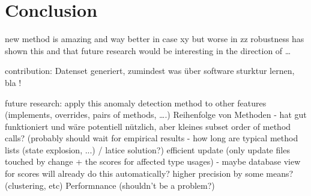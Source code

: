 \chapter{Conclusion}
	new method is amazing and way better in case xy but worse in zz
    robustness has shown this and that
    future research would be interesting in the direction of \ldots

contribution:
    Datenset generiert, zumindest was über software sturktur lernen, bla !

future research:
    apply this anomaly detection method to other features (implements, overrides, pairs of methods, \ldots.)
    Reihenfolge von Methoden - hat gut funktioniert und wäre potentiell nützlich, aber kleines subset
	order of method calls? (probably should wait for empirical results - how long are typical method lists (state explosion, ...) / latice solution?)
	efficient update (only update files touched by change + the scores for affected type usages) - maybe database view for scores will already do this automatically? 
	higher precision by some means? (clustering, etc)
	Performnance (shouldn't be a problem?)

